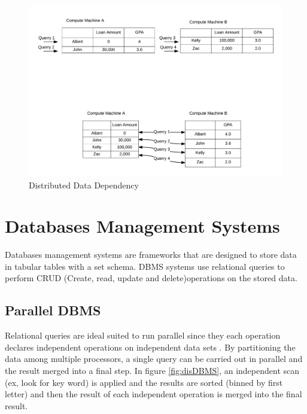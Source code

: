 \documentclass[10pt,twocolumn]{IEEEtran11}
\begin{document}
\begin{figure}[h]
\centering
\includegraphics[scale=0.12]{images/parallelComputation.png}
\caption{Distributed Data Dependency}
\label{fig:distDataDependency}
\end{figure}

\section{Databases Management Systems}

Databases management systems are  frameworks that are designed to store data in tabular tables with a set schema.  DBMS systems use relational queries to perform CRUD 
(Create, read, update and delete)operations on the stored data.  


\subsection{Parallel DBMS}

Relational queries are ideal suited to run parallel since they
each operation declares independent operations on independent data sets \cite{dewitt1992parallel}.  By partitioning the data among multiple processors, a single query can be carried out in parallel and the result merged into a final step.  In figure \ref{fig:disDBMS}, an independent scan (ex, look for key word) is applied and the results are sorted (binned by first letter) and then the result of each independent operation is merged into the final result.
\end{document}
